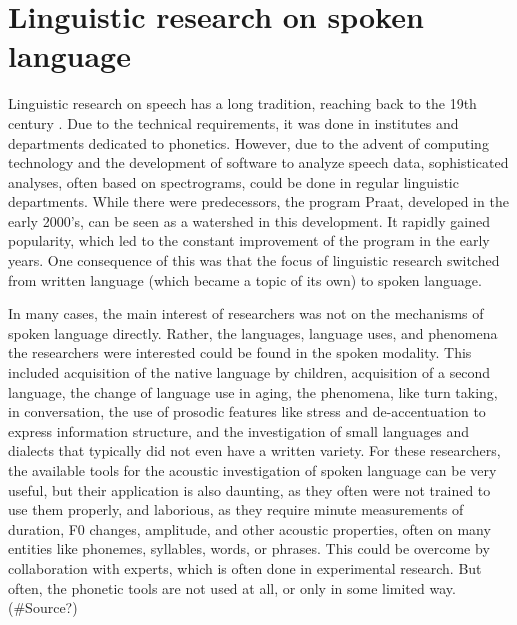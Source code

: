 \section{Linguistic research on spoken language} 

Linguistic research on speech has a long tradition, reaching back to the 19th century \cite{levelt2013}. Due to the technical requirements, it was done in institutes and departments dedicated to phonetics. However, due to the advent of computing technology and the development of software to analyze speech data, sophisticated analyses, often based on spectrograms, could be done in regular linguistic departments. While there were predecessors, the program Praat, developed in the early 2000's, can be seen as a watershed in this development. It rapidly gained popularity, which led to the constant improvement of the program in the early years. One consequence of this was that the focus of linguistic research switched from written language (which became a topic of its own) to spoken language. 

In many cases, the main interest of researchers was not on the mechanisms of spoken language directly. Rather, the languages, language uses, and phenomena the researchers were interested could be found in the spoken modality. This included acquisition of the native language by children, acquisition of a second language, the change of language use in aging, the phenomena, like turn taking, in conversation, the use of prosodic features like stress and de-accentuation to express information structure, and the investigation of small languages and dialects that typically did not even have a written variety. For these researchers, the available tools for the acoustic investigation of spoken language can be very useful, but their application is also daunting, as they often were not trained to use them properly, and laborious, as they require minute measurements of duration, F0 changes, amplitude, and other acoustic properties, often on many entities like phonemes, syllables, words, or phrases. This could be overcome by collaboration with experts, which is often done in experimental research. But often, the phonetic tools are not used at all, or only in some limited way. (#Source?) 

